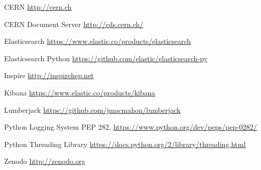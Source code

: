 \documentclass[a4paper,11pt]{article} %
\begin{document}
\begin{description*}
  \item[CERN] \url{http://cern.ch}
  \item[CERN Document Server] \url{http://cds.cern.ch/}
  \item[Elasticsearch] \url{https://www.elastic.co/products/elasticsearch}
  \item[Elasticsearch Python] \url{https://github.com/elastic/elasticsearch-py}
  \item[Inspire] \url{http://inspirehep.net}
  \item[Kibana] \url{https://www.elastic.co/products/kibana}
  \item[Lumberjack] \url{https://github.com/jmacmahon/lumberjack}
  \item[Python Logging System] PEP 282, \url{https://www.python.org/dev/peps/pep-0282/}
  \item[Python Threading Library] \url{https://docs.python.org/2/library/threading.html}
  \item[Zenodo] \url{http://zenodo.org}
\end{description*}
\end{document}
